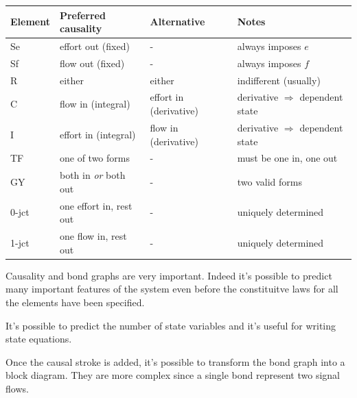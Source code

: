 \begin{center}
\begin{tabular}{llll}
  \toprule
  \textbf{Element} & \textbf{Preferred causality} & \textbf{Alternative} & \textbf{Notes}\\
  \midrule
  Se & effort out (fixed) & - & always imposes $e$\\
  Sf & flow out (fixed) & - & always imposes $f$\\
  R  & either & either & indifferent (usually)\\
  C  & flow in (integral) & effort in (derivative) & derivative $\Rightarrow$ dependent state\\
  I  & effort in (integral) & flow in (derivative) & derivative $\Rightarrow$ dependent state\\
  TF & one of two forms & - & must be one in, one out\\
 
  GY & both in \emph{or} both out & - & two valid forms\\
  0-jct & one effort in, rest out & - & uniquely determined\\
  1-jct & one flow in, rest out & - & uniquely determined\\
  \bottomrule
\end{tabular}
\end{center}


Causality and bond graphs are very important. Indeed it's possible to predict many important features of the system
even before the constituitve laws for all the elements have been specified. 

It's possible to predict the number of state variables and it's useful for writing state equations. 

\vspace{0.5cm}


Once the causal stroke is added, it's possible to transform the bond graph into a block diagram.
They are more complex since a single bond represent two signal flows.